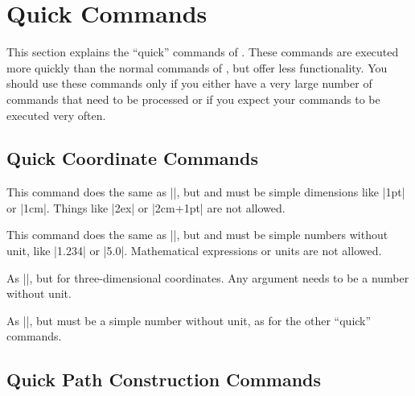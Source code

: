 %
%
%


\section[base-quick]{Quick Commands}

This section explains the ``quick'' commands of \pgfname. These commands are
executed more quickly than the normal commands of \pgfname, but offer less
functionality. You should use these commands only if you either have a very
large number of commands that need to be processed or if you expect your
commands to be executed very often.


\subsection{Quick Coordinate Commands}

\begin{command}{\pgfqpoint{}}
    This command does the same as |\pgfpoint|, but  and  must
    be simple dimensions like |1pt| or |1cm|. Things like |2ex| or |2cm+1pt|
    are not allowed.
\end{command}

\begin{command}{\pgfqpointxy{}}
    This command does the same as |\pgfpointxy|, but  and
     must be simple numbers without unit, like |1.234| or |5.0|.
    Mathematical expressions or units are not allowed.
\end{command}

\begin{command}{\pgfqpointxyz{}}
    As |\pgfqpointxy|, but for three-dimensional coordinates. Any argument
    needs to be a number without unit.
\end{command}

\begin{command}{\pgfqpointscale{}}
    As |\pgfpointscale|, but  must be a simple number without
    unit, as for the other ``quick'' commands.
\end{command}


\subsection{Quick Path Construction Commands}

